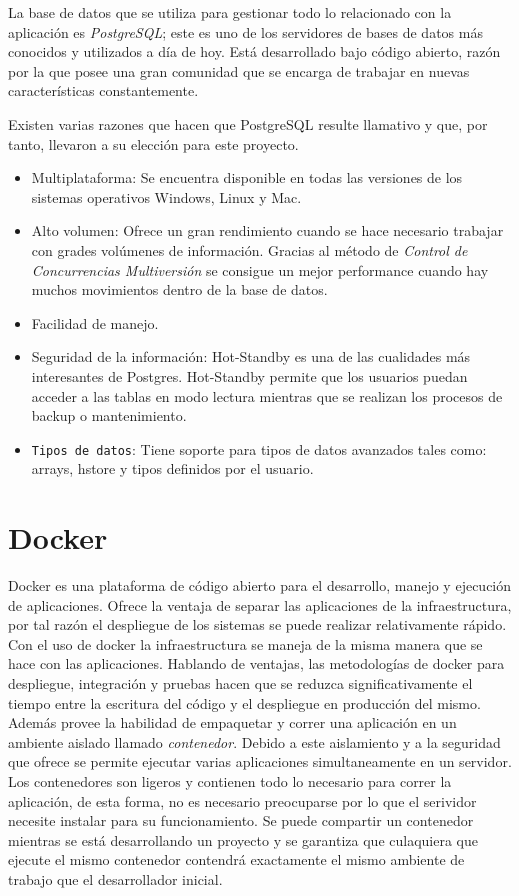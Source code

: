 La base de datos que se utiliza para gestionar todo lo relacionado con la aplicación es \textit{PostgreSQL}; este es uno de los servidores de bases de datos más conocidos y utilizados a día de hoy. Está desarrollado bajo código abierto, razón por la que posee una gran comunidad que se encarga de trabajar en nuevas características constantemente. 

Existen varias razones que hacen que PostgreSQL resulte llamativo y que, por tanto, llevaron a su elección para este proyecto.
\begin{itemize}
	\item Multiplataforma: Se encuentra disponible en todas las versiones de los sistemas operativos Windows, Linux y Mac.
	\item Alto volumen: Ofrece un gran rendimiento cuando se hace necesario trabajar con grades volúmenes de información. Gracias al método de \textit{Control de Concurrencias Multiversión} se consigue un mejor performance cuando hay muchos movimientos dentro de la base de datos.
	\item Facilidad de manejo.
	\item Seguridad de la información: Hot-Standby es una de las cualidades más interesantes de Postgres. Hot-Standby permite que los usuarios puedan acceder a las tablas en modo lectura mientras que se realizan los procesos de backup o mantenimiento.
	\item \texttt{Tipos de datos}: Tiene soporte para tipos de datos avanzados tales como: arrays, hstore y tipos definidos por el usuario.
\end{itemize}

\section{Docker} 

Docker es una plataforma de código abierto para el desarrollo, manejo y ejecución de aplicaciones. Ofrece la ventaja de separar las aplicaciones de la infraestructura, por tal razón el despliegue de los sistemas se puede realizar relativamente rápido. Con el uso de docker  la infraestructura se maneja de la misma manera que se hace con las aplicaciones. Hablando de ventajas, las metodologías de docker para despliegue, integración y pruebas hacen que se reduzca significativamente el tiempo entre la escritura del código y el despliegue en producción del mismo. Además provee la habilidad de empaquetar y correr una aplicación en un ambiente aislado llamado \textit{contenedor}. Debido a este aislamiento y a la seguridad que ofrece se permite ejecutar varias aplicaciones simultaneamente en un servidor. Los contenedores son ligeros y contienen todo lo necesario para correr la aplicación, de esta forma, no es necesario preocuparse por lo que el serividor necesite instalar para su funcionamiento. Se puede compartir un contenedor mientras se está desarrollando  un proyecto y se garantiza que culaquiera que ejecute el mismo contenedor contendrá exactamente el mismo ambiente de trabajo que el desarrollador inicial.\cite{docker_dfn}

